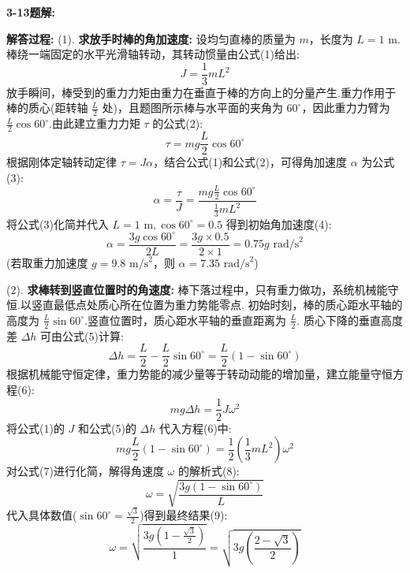 \vspace{2em}

\textbf{3-13题解:}


\textbf{解答过程:}
(1). \textbf{求放手时棒的角加速度:}
设均匀直棒的质量为 $m$，长度为 $L = 1\text{ m}$.棒绕一端固定的水平光滑轴转动，其转动惯量由公式(1)给出:
\begin{equation}
	J = \frac{1}{3}mL^2
\end{equation}
放手瞬间，棒受到的重力力矩由重力在垂直于棒的方向上的分量产生.重力作用于棒的质心(距转轴 $\frac{L}{2}$ 处)，且题图所示棒与水平面的夹角为 $60^\circ$，因此重力力臂为 $\frac{L}{2} \cos 60^\circ$.由此建立重力力矩 $\tau$ 的公式(2):
\begin{equation}
	\tau = mg \frac{L}{2} \cos 60^\circ
\end{equation}
根据刚体定轴转动定律 $\tau = J\alpha$，结合公式(1)和公式(2)，可得角加速度 $\alpha$ 为公式(3):
\begin{equation}
	\alpha = \frac{\tau}{J} = \frac{mg \frac{L}{2} \cos 60^\circ}{\frac{1}{3}mL^2}
\end{equation}
将公式(3)化简并代入 $L = 1\text{ m}, \cos 60^\circ = 0.5$ 得到初始角加速度(4):
\begin{equation}
	\alpha = \frac{3g \cos 60^\circ}{2L} = \frac{3g \times 0.5}{2 \times 1} = 0.75g \text{ rad/s}^2
\end{equation}
(若取重力加速度 $g = 9.8\text{ m/s}^2$，则 $\alpha = 7.35\text{ rad/s}^2$)

(2). \textbf{求棒转到竖直位置时的角速度:}
棒下落过程中，只有重力做功，系统机械能守恒.以竖直最低点处质心所在位置为重力势能零点.
初始时刻，棒的质心距水平轴的高度为 $\frac{L}{2} \sin 60^\circ$.竖直位置时，质心距水平轴的垂直距离为 $\frac{L}{2}$.
质心下降的垂直高度差 $\Delta h$ 可由公式(5)计算:
\begin{equation}
	\Delta h = \frac{L}{2} - \frac{L}{2} \sin 60^\circ = \frac{L}{2}(1 - \sin 60^\circ)
\end{equation}
根据机械能守恒定律，重力势能的减少量等于转动动能的增加量，建立能量守恒方程(6):
\begin{equation}
	mg \Delta h = \frac{1}{2} J \omega^2
\end{equation}
将公式(1)的 $J$ 和公式(5)的 $\Delta h$ 代入方程(6)中:
\begin{equation}
	mg \frac{L}{2}(1 - \sin 60^\circ) = \frac{1}{2} \left(\frac{1}{3}mL^2\right) \omega^2
\end{equation}
对公式(7)进行化简，解得角速度 $\omega$ 的解析式(8):
\begin{equation}
	\omega = \sqrt{\frac{3g(1 - \sin 60^\circ)}{L}}
\end{equation}
代入具体数值($\sin 60^\circ = \frac{\sqrt{3}}{2}$)得到最终结果(9):
\begin{equation}
	\omega = \sqrt{\frac{3g(1 - \frac{\sqrt{3}}{2})}{1}} = \sqrt{3g \left(\frac{2-\sqrt{3}}{2}\right)}
\end{equation}

